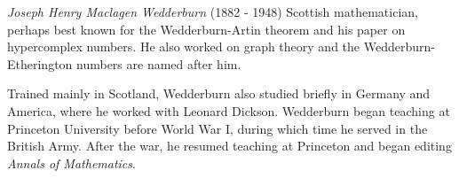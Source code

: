 \documentclass[12pt]{article}
\begin{document}
\emph{Joseph Henry Maclagen Wedderburn} (1882 - 1948) Scottish mathematician, perhaps best known for the Wedderburn-Artin theorem and his paper on hypercomplex numbers. He also worked on graph theory and the Wedderburn-Etherington numbers are named after him.

Trained mainly in Scotland, Wedderburn also studied briefly in Germany and America, where he worked with Leonard Dickson. Wedderburn began teaching at Princeton University before World War I, during which time he served in the British Army. After the war, he resumed teaching at Princeton and began editing {\it Annals of Mathematics}.


\end{document}
